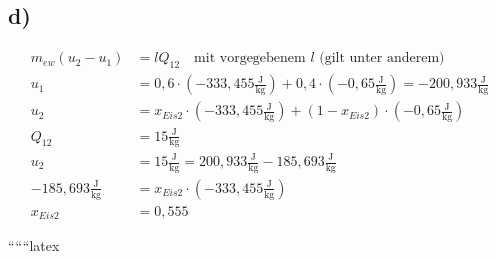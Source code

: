 \subsection*{d)}
\begin{align*}
    m_{ew} (u_2 - u_1) &= l Q_{12} \quad \text{mit vorgegebenem } l \text{ (gilt unter anderem)} \\
    u_1 &= 0,6 \cdot (-333,455 \frac{\text{J}}{\text{kg}}) + 0,4 \cdot (-0,65 \frac{\text{J}}{\text{kg}}) = -200,933 \frac{\text{J}}{\text{kg}} \\
    u_2 &= x_{Eis2} \cdot (-333,455 \frac{\text{J}}{\text{kg}}) + (1 - x_{Eis2}) \cdot (-0,65 \frac{\text{J}}{\text{kg}}) \\
    Q_{12} &= 15 \frac{\text{J}}{\text{kg}} \\
    u_2 &= 15 \frac{\text{J}}{\text{kg}} = 200,933 \frac{\text{J}}{\text{kg}} - 185,693 \frac{\text{J}}{\text{kg}} \\
    -185,693 \frac{\text{J}}{\text{kg}} &= x_{Eis2} \cdot (-333,455 \frac{\text{J}}{\text{kg}}) \\
    x_{Eis2} &= 0,555
\end{align*}

``````latex


